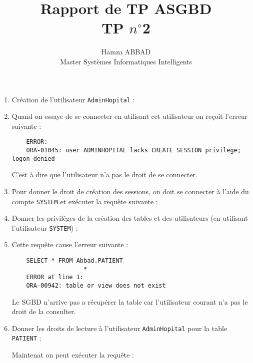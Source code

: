 \documentclass[12pt,a4paper]{article}
\author{Hamza ABBAD\\ Master Systèmes Informatiques Intelligents}
\title{\textbf{Rapport de TP ASGBD} \\ TP $n^{\circ}$2}
\begin{document}
\maketitle
\begin{enumerate}
	\item Création de l'utilisateur \texttt{AdminHopital} :
	
	\item Quand on essaye de se connecter en utilisant cet utilisateur on reçoit l'erreur suivante :
	\begin{verbatim}
	ERROR:
	ORA-01045: user ADMINHOPITAL lacks CREATE SESSION privilege; logon denied
	\end{verbatim}
	C'est à dire que l'utilisateur n'a pas le droit de se connecter.
	\item Pour donner le droit de création des sessions, on doit se connecter à l'aide du compte \texttt{SYSTEM}
	et exécuter la requête suivante :
	
	\item Donner les privilèges de la création des tables et des utilisateurs (en utilisant l'utilisateur \texttt{SYSTEM}) :
	
	\item Cette requête cause l'erreur suivante :
	\begin{verbatim}
	SELECT * FROM Abbad.PATIENT
                    *
	ERROR at line 1:
	ORA-00942: table or view does not exist
	\end{verbatim}
	Le SGBD n'arrive pas a récupérer la table car l'utilisateur courant n'a pas le droit de la consulter.
	\item Donner les droits de lecture à l'utilisateur \texttt{AdminHopital} pour la table \texttt{PATIENT} :
	
	Maintenat on peut exécuter la requête :
	
\end{enumerate}
\end{document}
